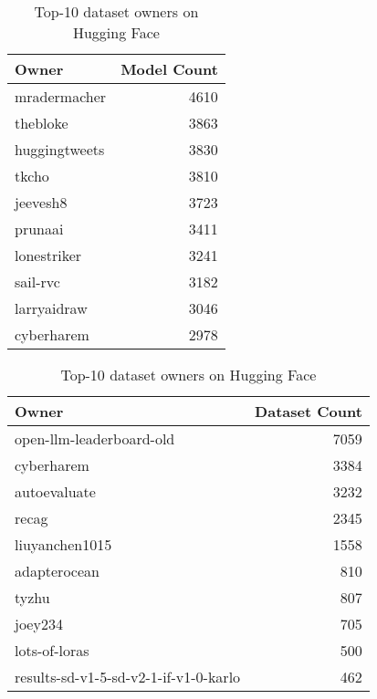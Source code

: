 \begin{table}[]
\caption{Top-10 model owners on Hugging Face}
\label{tab:top-owners}
\begin{tabular}{lr}
\hline
\textbf{Owner} & \textbf{Model Count} \\ \hline
mradermacher & 4610 \\
thebloke & 3863 \\
huggingtweets & 3830 \\
tkcho & 3810 \\
jeevesh8 & 3723 \\
prunaai & 3411 \\
lonestriker & 3241 \\
sail-rvc & 3182 \\
larryaidraw & 3046 \\
cyberharem & 2978 \\ \hline
\end{tabular}%

\vspace{0.3cm}
\caption{Top-10 dataset owners on Hugging Face}
\label{tab:top-dataset-owners}
\begin{tabular}{lr}
\hline
\textbf{Owner} & \textbf{Dataset Count} \\ \hline
open-llm-leaderboard-old & 7059 \\
cyberharem & 3384 \\
autoevaluate & 3232 \\
recag & 2345 \\
liuyanchen1015 & 1558 \\
adapterocean & 810 \\
tyzhu & 807 \\
joey234 & 705 \\
lots-of-loras & 500 \\
results-sd-v1-5-sd-v2-1-if-v1-0-karlo & 462 \\ \hline
\end{tabular}%
\end{table}
